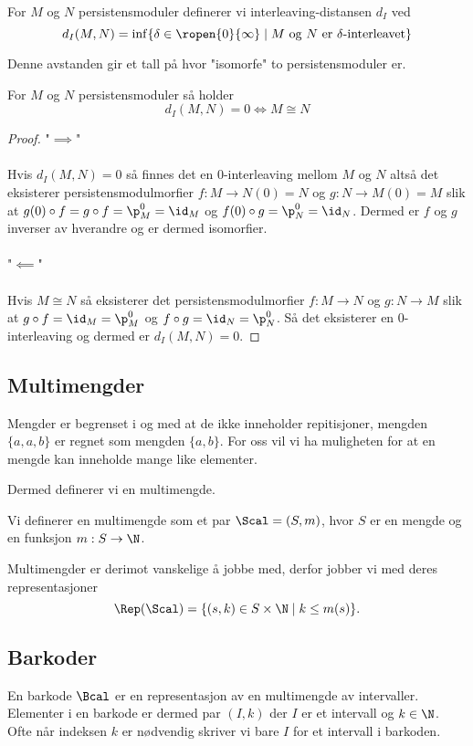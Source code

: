 \begin{definition}\label{Def:label}
	For $M$ og $N$ persistensmoduler definerer vi interleaving-distansen $d_I$ ved
	\[d_I(M,N) = \inf\{\delta\in \ropen{0}{\infty}\mid \text{$M$ og $N$ er $\delta$-interleavet}\}\]
\end{definition}
Denne avstanden gir et tall på hvor "isomorfe" to persistensmoduler er.

\begin{proposition}\label{Cor:label}
	For $M$ og $N$ persistensmoduler så holder
	\[d_I(M,N) = 0 \iff M\cong N\]
\end{proposition}
\begin{proof}
	"$\implies$"\\\\
	Hvis $d_I(M,N) = 0$ så finnes det en $0$-interleaving mellom $M$ og $N$ altså det eksisterer persistensmodulmorfier $f: M \to N(0)=N$ og $g: N\to M(0)=M$ slik at $g(0)\circ f = g\circ f = \p_M^0=\id_M$ og $f(0)\circ g = \p_N^0=\id_N$. Dermed er $f$ og $g$ inverser av hverandre og er dermed isomorfier.\\\\
	"$\impliedby$"\\\\
	Hvis $M\cong N$ så eksisterer det persistensmodulmorfier $f:M\to N$ og $g:N\to M$ slik at $g\circ f = \id_M=\p_M^0$ og $f\circ g=\id_N=\p_N^0$. Så det eksisterer en $0$-interleaving og dermed er $d_I(M,N) = 0$.
\end{proof}

\subsection{Multimengder}
Mengder er begrenset i og med at de ikke inneholder repitisjoner, mengden $\{a,a,b\}$ er regnet som mengden $\{a,b\}$. For oss vil vi ha muligheten for at en mengde kan inneholde mange like elementer.

Dermed definerer vi en multimengde.
\begin{definition}\label{Def:label}
    Vi definerer en multimengde som et par $\Scal = (S,m)$, hvor $S$ er en mengde og en funksjon $m: S\to\N$.
\end{definition}

Multimengder er derimot vanskelige å jobbe med, derfor jobber vi med deres representasjoner
\[\Rep(\Scal) = \{(s,k)\in S\times\N\;|\; k \leq m(s)\}.\]

\subsection{Barkoder}
En barkode $\Bcal$ er en representasjon av en multimengde av intervaller. Elementer i en barkode er dermed par $(I,k)$ der $I$ er et intervall og $k\in\N$. Ofte når indeksen $k$ er nødvendig skriver vi bare $I$ for et intervall i barkoden.

